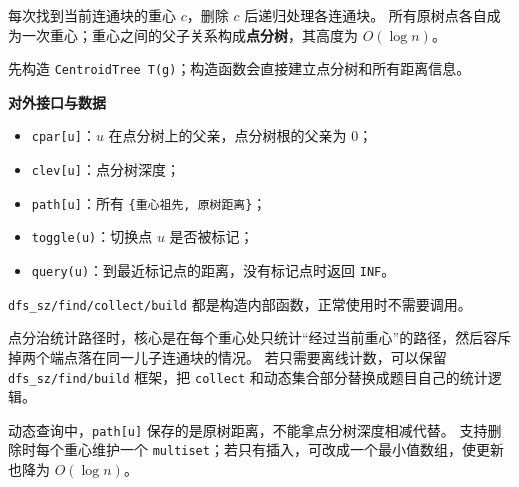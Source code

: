 每次找到当前连通块的重心 $c$，删除 $c$ 后递归处理各连通块。
所有原树点各自成为一次重心；重心之间的父子关系构成\textbf{点分树}，其高度为 $O(\log n)$。

先构造 \texttt{CentroidTree T(g)}；构造函数会直接建立点分树和所有距离信息。

\textbf{对外接口与数据}

\begin{itemize}
  \item \texttt{cpar[u]}：$u$ 在点分树上的父亲，点分树根的父亲为 $0$；
  \item \texttt{clev[u]}：点分树深度；
  \item \texttt{path[u]}：所有 \texttt{\{重心祖先, 原树距离\}}；
  \item \texttt{toggle(u)}：切换点 $u$ 是否被标记；
  \item \texttt{query(u)}：到最近标记点的距离，没有标记点时返回 \texttt{INF}。
\end{itemize}

\texttt{dfs\_sz/find/collect/build} 都是构造内部函数，正常使用时不需要调用。

点分治统计路径时，核心是在每个重心处只统计“经过当前重心”的路径，然后容斥掉两个端点落在同一儿子连通块的情况。
若只需要离线计数，可以保留 \texttt{dfs\_sz/find/build} 框架，把 \texttt{collect} 和动态集合部分替换成题目自己的统计逻辑。

动态查询中，\texttt{path[u]} 保存的是原树距离，不能拿点分树深度相减代替。
支持删除时每个重心维护一个 \texttt{multiset}；若只有插入，可改成一个最小值数组，使更新也降为 $O(\log n)$。

